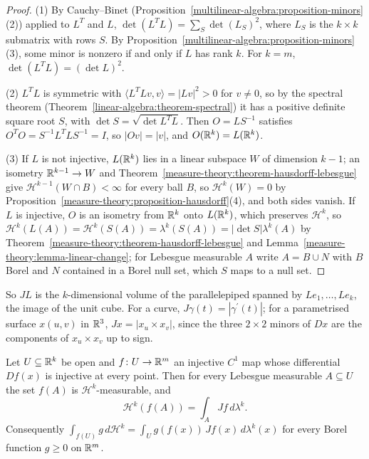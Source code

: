 \begin{proof}
(1) By Cauchy--Binet (Proposition~\ref{multilinear-algebra:proposition-minors}(2)) applied to $L^T$ and $L$, $\det(L^TL) = \sum_S\det(L_{S})^2$, where $L_S$ is the $k \times k$ submatrix with rows
$S$. By Proposition~\ref{multilinear-algebra:proposition-minors}(3), some minor is nonzero if and only if $L$ has rank $k$. For $k = m$, $\det(L^TL) = (\det L)^2$.

(2) $L^TL$ is symmetric with $\langle L^TLv, v\rangle = |Lv|^2 > 0$ for $v \neq 0$, so by the spectral theorem (Theorem~\ref{linear-algebra:theorem-spectral}) it has a positive definite square root $S$,
with $\det S = \sqrt{\det L^TL}$. Then $O = LS^{-1}$ satisfies $O^TO = S^{-1}L^TLS^{-1} = I$, so $|Ov| = |v|$, and $O(\mathbb{R}^k) = L(\mathbb{R}^k)$.

(3) If $L$ is not injective, $L(\mathbb{R}^k)$ lies in a linear subspace $W$ of dimension $k - 1$; an isometry $\mathbb{R}^{k-1} \to W$ and Theorem~\ref{measure-theory:theorem-hausdorff-lebesgue} give
$\mathcal{H}^{k-1}(W \cap B) < \infty$ for every ball $B$, so $\mathcal{H}^k(W) = 0$ by Proposition~\ref{measure-theory:proposition-hausdorff}(4), and both sides vanish. If $L$ is injective, $O$ is an
isometry from $\mathbb{R}^k$ onto $L(\mathbb{R}^k)$, which preserves $\mathcal{H}^k$, so $\mathcal{H}^k(L(A)) = \mathcal{H}^k(S(A)) = \lambda^k(S(A)) = |\det S|\lambda^k(A)$ by
Theorem~\ref{measure-theory:theorem-hausdorff-lebesgue} and Lemma~\ref{measure-theory:lemma-linear-change}; for Lebesgue measurable $A$ write $A = B \cup N$ with $B$ Borel and $N$ contained in a Borel null
set, which $S$ maps to a null set.
\end{proof}

So $JL$ is the $k$-dimensional volume of the parallelepiped spanned by $Le_1, \ldots, Le_k$, the image of the unit cube. For a curve, $J\gamma(t) = |\gamma^{\prime}(t)|$; for a parametrised
surface $x(u, v)$ in $\mathbb{R}^3$, $Jx = |x_u \times x_v|$, since the three $2 \times 2$ minors of $Dx$ are the components of $x_u \times x_v$ up to sign.

\begin{theorem}\label{measure-theory:theorem-area-formula}
Let $U \subseteq \mathbb{R}^k$ be open and $f \colon U \to \mathbb{R}^m$ an injective $C^1$ map whose differential $Df(x)$ is injective at every point. Then for every Lebesgue measurable $A \subseteq U$ the set
$f(A)$ is $\mathcal{H}^k$-measurable, and
\[
\mathcal{H}^k(f(A)) = \int_AJf\,d\lambda^k .
\]
Consequently $\int_{f(U)}g\,d\mathcal{H}^k = \int_Ug(f(x))\,Jf(x)\,d\lambda^k(x)$ for every Borel function $g \geq 0$ on $\mathbb{R}^m$.
\end{theorem}

